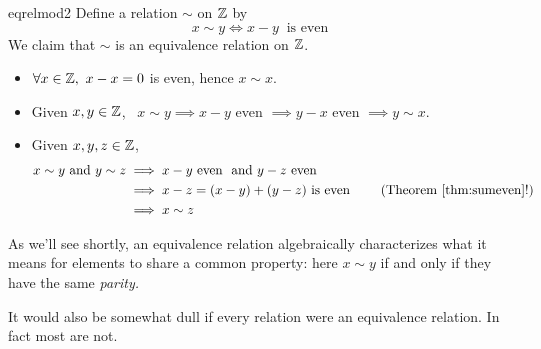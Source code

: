 \begin{example}{}{eqrelmod2}
	Define a relation $\sim$ on $\mathbb{Z}$ by
	\[
		x\sim y\iff x-y\ \text{ is even} \tag{otherwise said, $x\equiv y\spmod 2$}
	\]
	We claim that $\sim$ is an equivalence relation on $\mathbb{Z}$.
	\begin{itemize}
		\item[] $\forall x\in\mathbb{Z},\ x-x=0$ is even, hence $x\sim x$.
		\item[]\eqsymm Given $x,y\in\mathbb{Z}$, \ $x\sim y\implies x-y$ even $\implies y-x$ even $\implies y\sim x$.
		\item[]\eqtrans Given $x,y,z\in\mathbb{Z}$,
		\begin{align*}
			x\sim y \text{ and } y\sim z&\implies x-y\text{ even \ and }y-z\text{ even }\\
			&\implies x-z=(x-y)+(y-z)\text{ is even } \tag{Theorem \ref{thm:sumeven}!}\\
			&\implies x\sim z
		\end{align*}
	\end{itemize}
As we'll see shortly, an equivalence relation algebraically characterizes what it means for elements to share a common property: here $x\sim y$ if and only if they have the same \emph{parity.}
\end{example}

\goodbreak


It would also be somewhat dull if every relation were an equivalence relation. In fact most are not.


